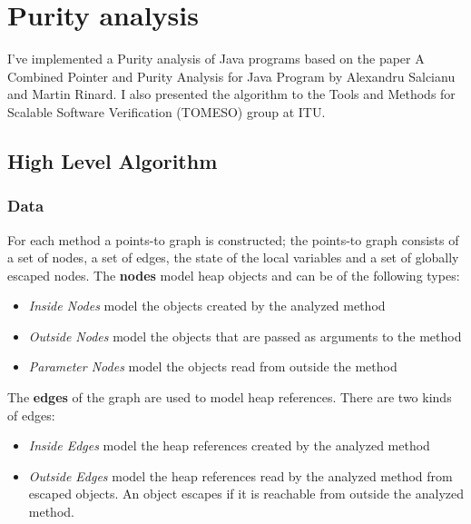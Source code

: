 \documentclass[11pt]{exam}
\begin{document}
\newpage

\section{Purity analysis}

I've implemented a Purity analysis of Java programs based on the paper
A Combined Pointer and Purity Analysis for Java Program by Alexandru
Salcianu and Martin Rinard. I also presented the algorithm to the
Tools and Methods for Scalable Software Verification (TOMESO) group at
ITU.

\subsection{High Level Algorithm}

\subsubsection*{Data}

For each method a points-to graph is constructed; the points-to graph
consists of a set of nodes, a set of edges, the state of the local
variables and a set of globally escaped nodes. The \textbf{nodes}
model heap objects and can be of the following types:

\begin{itemize}
  \setlength{\itemsep}{1pt}
  \setlength{\parskip}{0pt}
  \item \emph{Inside Nodes} model the objects created by the analyzed method
  \item \emph{Outside Nodes} model the objects that are passed as arguments
        to the method
  \item \emph{Parameter Nodes} model the objects read from outside the method
\end{itemize}

The \textbf{edges} of the graph are used to model heap references.
There are two kinds of edges:

\begin{itemize}
  \setlength{\itemsep}{1pt}
  \setlength{\parskip}{0pt}
  \item \emph{Inside Edges} model the heap references created by the analyzed
        method
  \item \emph{Outside Edges} model the heap references read by the analyzed
        method from escaped objects. An object escapes if it is reachable
        from outside the analyzed method.
\end{itemize}
\end{document}
